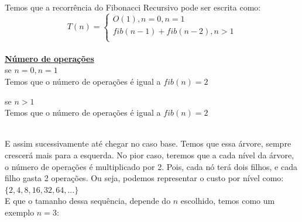 \documentclass[a4paper, 12pt]{article}
\begin{document}
Temos que a recorrência do Fibonacci Recursivo pode ser escrita como:
\begin{equation}
T(n) = \left\{ \begin{array}{l}
O(1), n=0, n=1 \\
fib(n-1)+fib(n-2), n>1\\
\end{array}
\right.
\end{equation} \\

\large\underline{\bf Número de operações} \\

se $n = 0, n = 1$\\
Temos que o número de operações é igual a $fib(n) = 2$

se $n>1$\\
Temos que o número de operações é igual a $fib(n) = 2$ \\

 \\

E assim sucessivamente até chegar no caso base. Temos que essa árvore, sempre crescerá mais para a esquerda. No pior caso, teremos que a cada nível da árvore, o número de operações é multiplicado por 2. Pois, cada nó terá dois filhos, e cada filho gasta 2 operações. Ou seja, podemos representar o custo por nível como: \\
$\{2,4,8,16,32,64,...\}$ \\

E que o tamanho dessa sequência, depende do $n$ escolhido, temos como um exemplo $n=3$: \\

 \\
\end{document}
